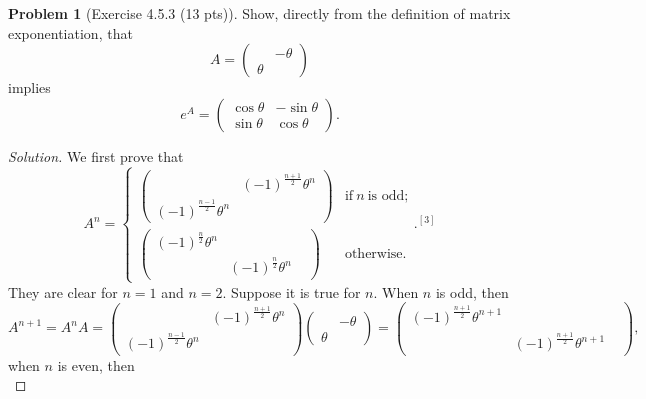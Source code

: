 \documentclass{article}
\theoremstyle{definition}
\newtheorem{problem}{Problem}
\theoremstyle{plain}
\begin{document}
\begin{problem}[Exercise 4.5.3 (13 pts)]Show, directly from the definition of matrix exponentiation, that
\begin{displaymath}
A=\begin{pmatrix}&-\theta\\ \theta&\end{pmatrix}
\end{displaymath}
implies
\begin{displaymath}
e^A=\begin{pmatrix}\cos\theta&-\sin\theta\\ \sin\theta&\cos\theta\end{pmatrix}.
\end{displaymath}
\end{problem}
\begin{adjustwidth}{0.7cm}{}
\color{blue}
\begin{proof}[Solution]
We first prove that
\begin{displaymath}
A^n=\left\{\begin{matrix}\begin{pmatrix}&(-1)^\frac{n+1}{2}\theta^n\\ (-1)^\frac{n-1}{2}\theta^n&\end{pmatrix}&\text{if}~n~\text{is odd;}\\ \begin{pmatrix}(-1)^\frac{n}{2}\theta^n&\\ &(-1)^\frac{n}{2}\theta^n&\end{pmatrix}&\text{otherwise.}\end{matrix}\right..^{[3]}
\end{displaymath}
They are clear for $n=1$ and $n=2$. Suppose it is true for $n$. When $n$ is odd, then
\begin{displaymath}
A^{n+1}=A^nA=\begin{pmatrix}&(-1)^\frac{n+1}{2}\theta^n\\ (-1)^\frac{n-1}{2}\theta^n&\end{pmatrix}\begin{pmatrix}&-\theta\\ \theta&\end{pmatrix}=\begin{pmatrix}(-1)^\frac{n+1}{2}\theta^{n+1}&\\ &(-1)^\frac{n+1}{2}\theta^{n+1}&\end{pmatrix},
\end{displaymath}
when $n$ is even, then
\begin{displaymath}

\end{displaymath}
\end{proof}
\end{adjustwidth}
\end{document}
